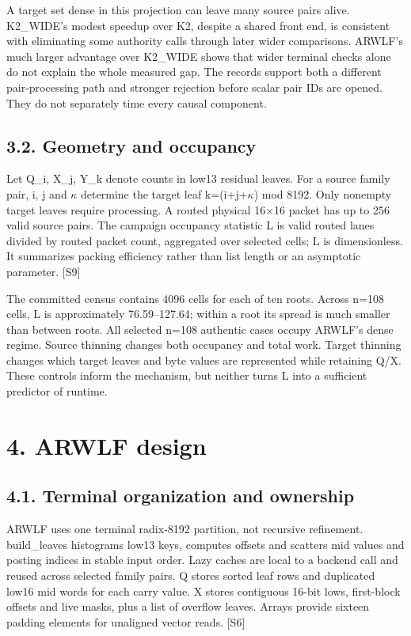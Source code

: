 \documentclass[10pt,letterpaper]{article}
\begin{document}
A target set dense in this projection can leave many source pairs alive. K2\_WIDE's modest speedup over K2, despite a shared front end, is consistent with eliminating some authority calls through later wider comparisons. ARWLF's much larger advantage over K2\_WIDE shows that wider terminal checks alone do not explain the whole measured gap. The records support both a different pair-processing path and stronger rejection before scalar pair IDs are opened. They do not separately time every causal component.


\subsection*{3.2. Geometry and occupancy}

Let Q\_i, X\_j, Y\_k denote counts in low13 residual leaves. For a source family pair, i, j and \ensuremath{\kappa} determine the target leaf k=(i+j+\ensuremath{\kappa}) mod 8192. Only nonempty target leaves require processing. A routed physical 16\ensuremath{\times}16 packet has up to 256 valid source pairs. The campaign occupancy statistic L is valid routed lanes divided by routed packet count, aggregated over selected cells; L is dimensionless. It summarizes packing efficiency rather than list length or an asymptotic parameter. [S9]


The committed census contains 4096 cells for each of ten roots. Across n=108 cells, L is approximately 76.59--127.64; within a root its spread is much smaller than between roots. All selected n=108 authentic cases occupy ARWLF's dense regime. Source thinning changes both occupancy and total work. Target thinning changes which target leaves and byte values are represented while retaining Q/X. These controls inform the mechanism, but neither turns L into a sufficient predictor of runtime.


\section*{4. ARWLF design}

\subsection*{4.1. Terminal organization and ownership}

ARWLF uses one terminal radix-8192 partition, not recursive refinement. build\_leaves histograms low13 keys, computes offsets and scatters mid values and posting indices in stable input order. Lazy caches are local to a backend call and reused across selected family pairs. Q stores sorted leaf rows and duplicated low16 mid words for each carry value. X stores contiguous 16-bit lows, first-block offsets and live masks, plus a list of overflow leaves. Arrays provide sixteen padding elements for unaligned vector reads. [S6]
\end{document}
